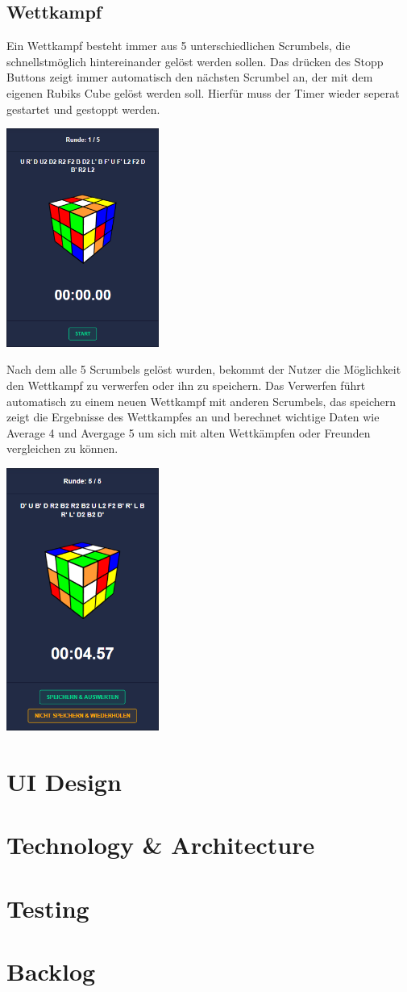 \documentclass[a4paper]{article}
\begin{document}
	\subsection*{Wettkampf}
	Ein Wettkampf besteht immer aus 5 unterschiedlichen Scrumbels, die schnellstmöglich hintereinander gelöst werden sollen. Das drücken des Stopp Buttons zeigt immer automatisch den nächsten Scrumbel an, der mit dem eigenen Rubiks Cube gelöst werden soll. Hierfür muss der Timer wieder seperat gestartet und gestoppt werden. 
	\begin{center}
		\includegraphics[width= 5cm, keepaspectratio]{img/competition}
	\end{center} 
	Nach dem alle 5 Scrumbels gelöst wurden, bekommt der Nutzer die Möglichkeit den Wettkampf zu verwerfen oder ihn zu speichern. Das Verwerfen führt automatisch zu einem neuen Wettkampf mit anderen Scrumbels, das speichern zeigt die Ergebnisse des Wettkampfes an und berechnet wichtige Daten wie Average 4 und Avergage 5 um sich mit alten Wettkämpfen oder Freunden vergleichen zu können.  
	\begin{center}
		\includegraphics[width= 5cm, keepaspectratio]{img/competitiondone}
	\end{center} 
	\section{UI Design}
	\section{Technology \& Architecture}
	\section{Testing}
	\section{Backlog}
\end{document}
